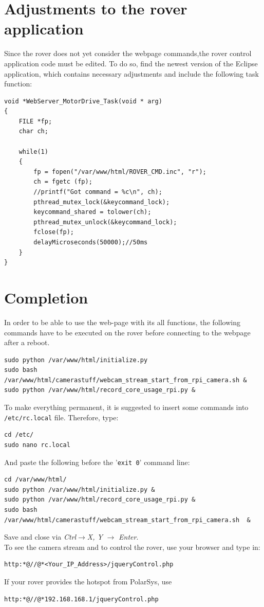 \section{Adjustments to the rover application}
Since the rover does not yet consider the webpage commands,the rover control application code must be edited. To do so, find the newest version of the Eclipse application, which contains necessary adjustments and include the following task function:
\begin{lstlisting}
void *WebServer_MotorDrive_Task(void * arg)
{
	FILE *fp;
	char ch;

	while(1)
	{
		fp = fopen("/var/www/html/ROVER_CMD.inc", "r");
		ch = fgetc (fp);
		//printf("Got command = %c\n", ch);
		pthread_mutex_lock(&keycommand_lock);	
		keycommand_shared = tolower(ch);
		pthread_mutex_unlock(&keycommand_lock);
		fclose(fp);
		delayMicroseconds(50000);//50ms
	}
}
\end{lstlisting}
\section{Completion}
In order to be able to use the web-page with its all functions, the following commands have to be executed on the rover before connecting to the webpage after a reboot.
\begin{lstlisting}
sudo python /var/www/html/initialize.py
sudo bash /var/www/html/camerastuff/webcam_stream_start_from_rpi_camera.sh &
sudo python /var/www/html/record_core_usage_rpi.py &
\end{lstlisting}
To make everything permanent, it is suggested to insert some commands into \texttt{/etc/rc.local} file. Therefore, type:
\begin{lstlisting}
cd /etc/
sudo nano rc.local
\end{lstlisting}
And paste the following before the '\texttt{exit 0}' command line: 
\begin{lstlisting}
cd /var/www/html/
sudo python /var/www/html/initialize.py &
sudo python /var/www/html/record_core_usage_rpi.py &
sudo bash /var/www/html/camerastuff/webcam_stream_start_from_rpi_camera.sh  &
\end{lstlisting}
Save and close via  \textit{Ctrl}$\rightarrow$\textit{X, Y }$\rightarrow$ \textit{Enter}.\\
To see the camera stream and to control the rover, use your browser and type in:
\begin{lstlisting}[label={lst:1}]
http:*@//@*<Your_IP_Address>/jqueryControl.php
\end{lstlisting}
If your rover provides the hotspot from PolarSys, use
\begin{lstlisting}[label={lst:partWrkflw}]
http:*@//@*192.168.168.1/jqueryControl.php
\end{lstlisting}
